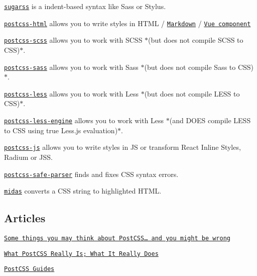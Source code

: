 \begin{DoxyItemize}
\item \href{https://github.com/postcss/sugarss}{\tt {\ttfamily sugarss}} is a indent-\/based syntax like Sass or Stylus.
\item \href{https://github.com/gucong3000/postcss-html}{\tt {\ttfamily postcss-\/html}} allows you to write styles in H\+T\+ML / \href{https://daringfireball.net/projects/markdown/syntax}{\tt Markdown} / \href{https://vue-loader.vuejs.org/}{\tt Vue component}
\item \href{https://github.com/postcss/postcss-scss}{\tt {\ttfamily postcss-\/scss}} allows you to work with S\+C\+SS $\ast$(but does not compile S\+C\+SS to C\+SS)$\ast$.
\item \href{https://github.com/AleshaOleg/postcss-sass}{\tt {\ttfamily postcss-\/sass}} allows you to work with Sass $\ast$(but does not compile Sass to C\+SS)$\ast$.
\item \href{https://github.com/webschik/postcss-less}{\tt {\ttfamily postcss-\/less}} allows you to work with Less $\ast$(but does not compile L\+E\+SS to C\+SS)$\ast$.
\item \href{https://github.com/Crunch/postcss-less}{\tt {\ttfamily postcss-\/less-\/engine}} allows you to work with Less $\ast$(and D\+O\+ES compile L\+E\+SS to C\+SS using true Less.\+js evaluation)$\ast$.
\item \href{https://github.com/postcss/postcss-js}{\tt {\ttfamily postcss-\/js}} allows you to write styles in JS or transform React Inline Styles, Radium or J\+SS.
\item \href{https://github.com/postcss/postcss-safe-parser}{\tt {\ttfamily postcss-\/safe-\/parser}} finds and fixes C\+SS syntax errors.
\item \href{https://github.com/ben-eb/midas}{\tt {\ttfamily midas}} converts a C\+SS string to highlighted H\+T\+ML.
\end{DoxyItemize}

\subsection*{Articles}


\begin{DoxyItemize}
\item \href{http://julian.io/some-things-you-may-think-about-postcss-and-you-might-be-wrong}{\tt Some things you may think about Post\+C\+S\+S… and you might be wrong}
\item \href{http://davidtheclark.com/its-time-for-everyone-to-learn-about-postcss}{\tt What Post\+C\+SS Really Is; What It Really Does}
\item \href{http://webdesign.tutsplus.com/series/postcss-deep-dive--cms-889}{\tt Post\+C\+SS Guides}
\end{DoxyItemize}

